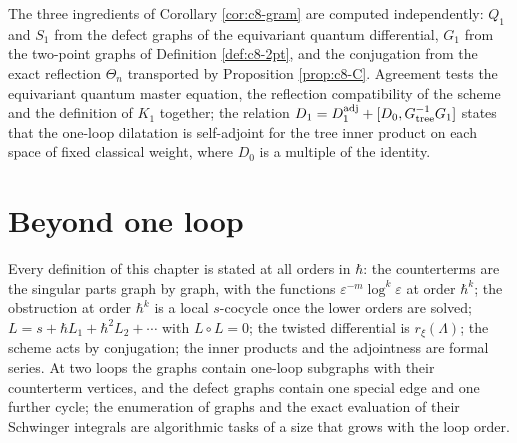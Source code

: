 \begin{remark}
The three ingredients of Corollary \ref{cor:c8-gram} are computed independently: $Q_1$ and $S_1$ from the defect graphs of the equivariant quantum differential, $G_1$ from the two-point graphs of Definition \ref{def:c8-2pt}, and the conjugation from the exact reflection $\Theta_n$ transported by Proposition \ref{prop:c8-C}. Agreement tests the equivariant quantum master equation, the reflection compatibility of the scheme and the definition of $K_1$ together; the relation $D_1=D_1^{\rm adj}+[D_0,G_{\rm tree}^{-1}G_1]$ states that the one-loop dilatation is self-adjoint for the tree inner product on each space of fixed classical weight, where $D_0$ is a multiple of the identity.
\end{remark}

\section{Beyond one loop}

\begin{remark}
Every definition of this chapter is stated at all orders in $\hbar$: the counterterms are the singular parts graph by graph, with the functions $\varepsilon^{-m}\log^k\varepsilon$ at order $\hbar^k$; the obstruction at order $\hbar^{k}$ is a local $s$-cocycle once the lower orders are solved; $L=s+\hbar L_1+\hbar^2L_2+\cdots$ with $L\circ L=0$; the twisted differential is $r_\xi(\Lambda)$; the scheme acts by conjugation; the inner products and the adjointness are formal series. At two loops the graphs contain one-loop subgraphs with their counterterm vertices, and the defect graphs contain one special edge and one further cycle; the enumeration of graphs and the exact evaluation of their Schwinger integrals are algorithmic tasks of a size that grows with the loop order.
\end{remark}
